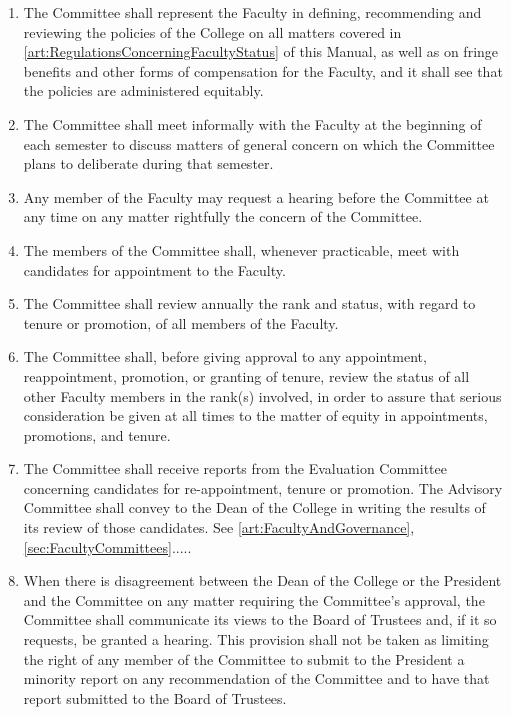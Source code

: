\documentclass{manual}
\newcommand{\itemLevelA}{\alph*.}
\newcommand{\itemLevelB}{\arabic*)}
\newcommand{\itemRefA}{\alph*}
\newcommand{\itemRefB}{\arabic*}
\begin{document}
\begin{enumerate}[label=\itemLevelA,ref=\itemRefA]
		\begin{enumerate}[label=\itemLevelB,ref=\itemRefB]
		\item The Committee shall represent the Faculty in defining, recommending and reviewing the policies of the College on all matters covered in \cref{art:RegulationsConcerningFacultyStatus} of this Manual, as well as on fringe benefits and other forms of compensation for the Faculty, and it shall see that the policies are administered equitably.
		\item The Committee shall meet informally with the Faculty at the beginning of each semester to discuss matters of general concern on which the Committee plans to deliberate during that semester.
		\item Any member of the Faculty may request a hearing before the Committee at any time on any matter rightfully the concern of the Committee.
		\item The members of the Committee shall, whenever practicable, meet with candidates for appointment to the Faculty.
		\item The Committee shall review annually the rank and status, with regard to tenure or promotion, of all members of the Faculty.
		\item The Committee shall, before giving approval to any appointment, reappointment, promotion, or granting of tenure, review the status of all other Faculty members in the rank(s) involved, in order to assure that serious consideration be given at all times to the matter of equity in appointments, promotions, and tenure.
		\item The Committee shall receive reports from the Evaluation Committee concerning candidates for re-appointment, tenure or promotion. The Advisory Committee shall convey to the Dean of the College in writing the results of its review of those candidates. See \cref{art:FacultyAndGovernance}, \cref{sec:FacultyCommittees}.....
		\item When there is disagreement between the Dean of the College or the President and the Committee on any matter requiring the Committee's approval, the Committee shall communicate its views to the Board of Trustees and, if it so requests, be granted a hearing. This provision shall not be taken as limiting the right of any member of the Committee to submit to the President a minority report on any recommendation of the Committee and to have that report submitted to the Board of Trustees.

\end{enumerate}
\end{enumerate}
\end{document}
